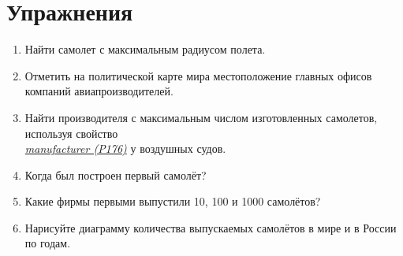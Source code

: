




\section{Упражнения}%
\marginnote[0\baselineskip]{%
    \MarginQuestion Какое воздушное судно здесь изображено?
\vspace{5pt}

\texttt{[image: ./chapter/aircraft/airship-SSSR-V6.jpg]}%

\vspace{5pt}
См. ответ %
    на с.~\pageref{answer:aircraft_question_airship_2}.
\label{fig:airship_question_aircraft}%
} %


\begin{enumerate}
\item Найти самолет с максимальным радиусом полета.
\item Отметить на политической карте мира местоположение главных офисов компаний авиапроизводителей.
\item Найти производителя с максимальным числом изготовленных самолетов, используя свойство\\\href{https://w.wiki/vF7}{\textit{manufacturer (P176)}} у воздушных судов.
\item Когда был построен первый самолёт?
\item Какие фирмы первыми выпустили 10, 100 и 1000 самолётов?
\item Нарисуйте диаграмму количества выпускаемых самолётов в мире и в России по годам.
\end{enumerate}
